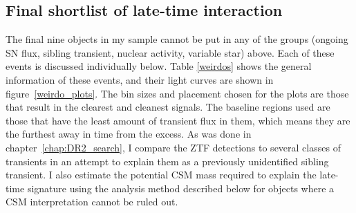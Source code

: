 \documentclass[a4paper,oneside,12pt, class=Latex/Classes/PhDthesisPSnPDF, crop=false]{standalone}
\begin{document}
\subsection{Final shortlist of late-time interaction}
\label{weirdo_section}
The final nine objects in my sample cannot be put in any of the groups (ongoing SN flux, sibling transient, nuclear activity, variable star) above. Each of these events is discussed individually below. Table \ref{weirdos} shows the general information of these events, and their light curves are shown in figure~\ref{weirdo_plots}. The bin sizes and placement chosen for the plots are those that result in the clearest and cleanest signals. The baseline regions used are those that have the least amount of transient flux in them, which means they are the furthest away in time from the excess. As was done in chapter~\ref{chap:DR2_search}, I compare the ZTF detections to several classes of transients in an attempt to explain them as a previously unidentified sibling transient. I also estimate the potential CSM mass required to explain the late-time signature using the analysis method described below for objects where a CSM interpretation cannot be ruled out.
\end{document}
